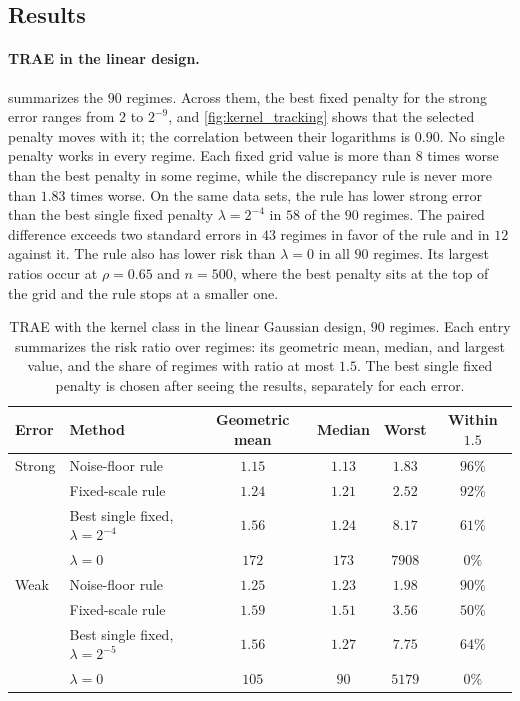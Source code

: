 \documentclass[12pt]{article}
\theoremstyle{plain}
\theoremstyle{definition}
\theoremstyle{remark}
\begin{document}
\subsection{Results}
\label{sec:experiment_results}

\paragraph{TRAE in the linear design.}
 summarizes the $90$ regimes. Across them, the best fixed penalty for the strong error ranges from $2$ to $2^{-9}$, and \cref{fig:kernel_tracking} shows that the selected penalty moves with it; the correlation between their logarithms is $0.90$. No single penalty works in every regime. Each fixed grid value is more than $8$ times worse than the best penalty in some regime, while the discrepancy rule is never more than $1.83$ times worse. On the same data sets, the rule has lower strong error than the best single fixed penalty $\lambda=2^{-4}$ in $58$ of the $90$ regimes. The paired difference exceeds two standard errors in $43$ regimes in favor of the rule and in $12$ against it. The rule also has lower risk than $\lambda=0$ in all $90$ regimes. Its largest ratios occur at $\rho=0.65$ and $n=500$, where the best penalty sits at the top of the grid and the rule stops at a smaller one.

\begin{table}[!htp]
\centering
\caption{TRAE with the kernel class in the linear Gaussian design, $90$ regimes. Each entry summarizes the risk ratio over regimes: its geometric mean, median, and largest value, and the share of regimes with ratio at most $1.5$. The best single fixed penalty is chosen after seeing the results, separately for each error.}
\label{tab:kernel_trae}
\small
\begin{tabular}{llcccc}
\toprule
Error & Method & Geometric mean & Median & Worst & Within $1.5$\\
\midrule
Strong & Noise-floor rule & $1.15$ & $1.13$ & $1.83$ & $96\%$\\
 & Fixed-scale rule & $1.24$ & $1.21$ & $2.52$ & $92\%$\\
 & Best single fixed, $\lambda=2^{-4}$ & $1.56$ & $1.24$ & $8.17$ & $61\%$\\
 & $\lambda=0$ & $172$ & $173$ & $7908$ & $0\%$\\
Weak & Noise-floor rule & $1.25$ & $1.23$ & $1.98$ & $90\%$\\
 & Fixed-scale rule & $1.59$ & $1.51$ & $3.56$ & $50\%$\\
 & Best single fixed, $\lambda=2^{-5}$ & $1.56$ & $1.27$ & $7.75$ & $64\%$\\
 & $\lambda=0$ & $105$ & $90$ & $5179$ & $0\%$\\
\bottomrule
\end{tabular}
\end{table}
\end{document}
